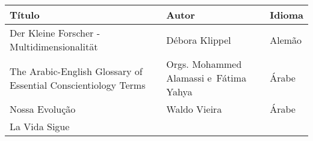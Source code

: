 \documentclass{gescons}
\begin{document}
\begin{longtable}[]{@{}
  >{\raggedright\arraybackslash}p{}
  >{\raggedright\arraybackslash}p{}
  >{\raggedright\arraybackslash}p{}@{}}
\toprule\noalign{}
\begin{minipage}[b]{\linewidth}\centering
\textbf{Título}
\end{minipage} & \begin{minipage}[b]{\linewidth}\centering
\textbf{Autor}
\end{minipage} & \begin{minipage}[b]{\linewidth}\centering
\textbf{Idioma}
\end{minipage} \\
\hline
\begin{minipage}[b]{\linewidth}\raggedright
Der Kleine Forscher - Multidimensionalität
\end{minipage} & \begin{minipage}[b]{\linewidth}\raggedright
Débora Klippel
\end{minipage} & \begin{minipage}[b]{\linewidth}\centering
Alemão
\end{minipage} \\
\hline
\begin{minipage}[b]{\linewidth}\raggedright
The Arabic-English Glossary of Essential Conscientiology Terms
\end{minipage} & \begin{minipage}[b]{\linewidth}\raggedright\addlinespace[2pt]
Orgs. Mohammed Alamassi e~Fátima Yahya
\end{minipage} & \begin{minipage}[b]{\linewidth}\centering
Árabe
\end{minipage} \\
\hline
\begin{minipage}[b]{\linewidth}\raggedright
Nossa Evolução
\end{minipage} & \begin{minipage}[b]{\linewidth}\raggedright
Waldo Vieira
\end{minipage} & \begin{minipage}[b]{\linewidth}\centering
Árabe
\end{minipage} \\
\hline
\begin{minipage}[b]{\linewidth}\raggedright
La Vida Sigue
\end{minipage} & \begin{minipage}[b]{\linewidth}\raggedright

\end{minipage}
\end{longtable}
\end{document}
